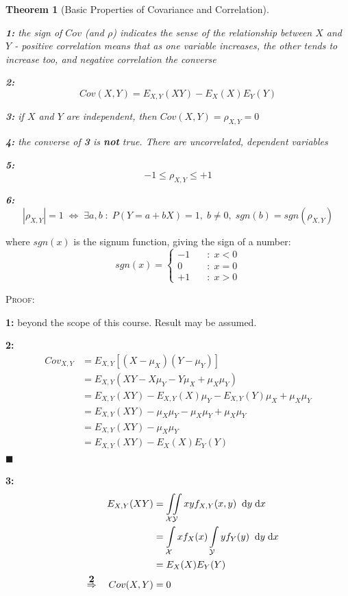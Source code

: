 \documentclass[12pt,a4paper]{article}
\newcommand{\imply}{\quad\Rightarrow\quad}
\newtheorem{thm}{Theorem}[subsection]
\newcommand{\diff}{\;\mathrm{d}}
\renewcommand{\imply}{\quad\Rightarrow\quad}
\begin{document}
\begin{thm}[Basic Properties of Covariance and Correlation]$\;$\par\vspace{1cm}

\noindent\textbf{1: } the sign of $Cov$ (and $\rho$) indicates the sense of the relationship between $X$ and $Y$ - positive correlation means that as one variable increases, the other tends to increase too, and negative correlation the converse

\noindent\textbf{2: } $$Cov(X,Y) = E_{X,Y}(XY) - E_{X}(X)E_{Y}(Y)$$

\noindent\textbf{3: } if $X$ and $Y$ are independent, then $Cov(X,Y) = \rho_{X,Y} = 0$

\noindent\textbf{4: } the converse of \textbf{3} is \textbf{not} true. There are uncorrelated, dependent variables

\noindent\textbf{5: } $$-1 \leq \rho_{X,Y} \leq +1$$

\noindent\textbf{6: } $$|\rho_{X,Y}| = 1 \; \Leftrightarrow\; \exists a,b \; : \; P(Y=a+bX) = 1,\; b\neq 0,\; sgn(b) = sgn(\rho_{X,Y})$$
\end{thm}
where $sgn(x)$ is the signum function, giving the sign of a number:
$$sgn(x) = \left\{\begin{array}{cl} -1\quad& : \; x<0\\ 0\quad& : \; x=0\\ +1\quad& :\; x >0\end{array}\right.$$

\noindent\textsc{Proof:}\par\vspace{1cm}

\noindent\textbf{1: } beyond the scope of this course. Result may be assumed.

\noindent\textbf{2: } \begin{align*}
Cov_{X,Y} &= E_{{X,Y}}[(X-\mu_X)(Y-\mu_Y)]\\
&= E_{{X,Y}}(XY - X\mu_Y - Y\mu_X + \mu_X\mu_Y)\\
&= E_{{X,Y}}(XY) - E_{X,Y}(X)\mu_Y - E_{{X,Y}}(Y)\mu_X + \mu_X\mu_Y\\
&= E_{{X,Y}}(XY) - \mu_X\mu_Y - \mu_X\mu_Y + \mu_X\mu_Y\\
&= E_{{X,Y}}(XY) - \mu_X\mu_Y\\
&= E_{{X,Y}}(XY) - E_{X}(X)E_{Y}(Y)
\end{align*}
\hfill$\blacksquare$

\noindent\textbf{3: }
\begin{align*}
E_{X,Y}(XY) &= \iint\limits_{\mathcal{X}\mathcal{Y}} xyf_{X,Y}(x,y)\;\diff y\diff x\\
&= \int\limits_{\mathcal{X}} xf_X(x) \int\limits_{\mathcal{Y}} yf_Y(y) \;\diff y \diff x\\
&= E_X(X)E_Y(Y)\\
\overset{\mbox{\bf 2}}{\imply} Cov(X,Y) &= 0
\end{align*}
\end{document}
